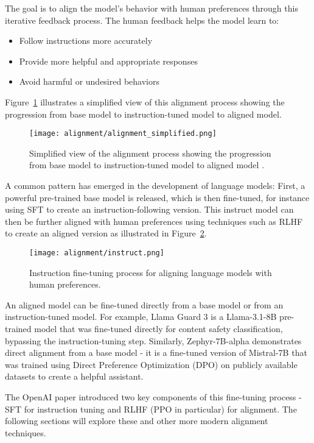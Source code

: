The goal is to align the model's behavior with human preferences through this iterative feedback process. The human feedback helps the model learn to:
\begin{itemize}
\item Follow instructions more accurately
\item Provide more helpful and appropriate responses  
\item Avoid harmful or undesired behaviors
\end{itemize}

Figure~\ref{fig:alignment-simplified} illustrates a simplified view of this alignment process showing the progression from base model to instruction-tuned model to aligned model.

\begin{figure}[H]
\centering
\texttt{[image: alignment/alignment\_simplified.png]}
\caption{Simplified view of the alignment process showing the progression from base model to instruction-tuned model to aligned model \cite{ouyang2022traininglanguagemodelsfollow}.}
\label{fig:alignment-simplified}
\end{figure}

A common pattern has emerged in the development of language models: First, a powerful pre-trained base model is released, which is then fine-tuned, for instance using SFT to create an instruction-following version. This instruct model can then be further aligned with human preferences using techniques such as RLHF to create an aligned version as illustrated in Figure~\ref{fig:instruct}.

\begin{figure}[H]
\centering
\texttt{[image: alignment/instruct.png]}
\caption{Instruction fine-tuning process for aligning language models with human preferences.}
\label{fig:instruct}
\end{figure}

An aligned model can be fine-tuned directly from a base model or from an instruction-tuned model. For example, Llama Guard 3  is a Llama-3.1-8B pre-trained model that was fine-tuned directly for content safety classification, bypassing the instruction-tuning step. Similarly, Zephyr-7B-alpha  demonstrates direct alignment from a base model - it is a fine-tuned version of Mistral-7B that was trained using Direct Preference Optimization (DPO) on publicly available datasets to create a helpful assistant.

The OpenAI paper introduced two key components of this fine-tuning process - SFT for instruction tuning and RLHF (PPO in particular) for alignment. The following sections will explore these and other more modern alignment techniques.


